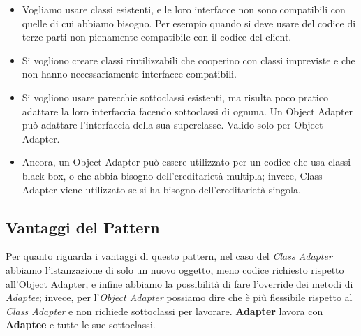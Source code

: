    \begin{itemize}
      
      \item Vogliamo usare classi esistenti, e le loro
      interfacce non sono compatibili con quelle di cui abbiamo bisogno.
      Per esempio quando si deve usare del codice di terze parti non 
      pienamente compatibile con il codice del client.
    
      \item Si vogliono creare classi riutilizzabili che cooperino con 
      classi impreviste e che non hanno necessariamente interfacce 
      compatibili.
      
      \item Si vogliono usare parecchie sottoclassi esistenti, ma risulta 
      poco pratico adattare la loro interfaccia facendo sottoclassi di ognuna. 
      Un Object Adapter può adattare l’interfaccia della sua superclasse. 
      Valido solo per Object Adapter.
      
      \item Ancora, un Object Adapter può essere utilizzato per un codice 
      che usa classi black-box, o che abbia bisogno dell’ereditarietà 
      multipla; invece, Class Adapter viene utilizzato se si ha bisogno 
      dell’ereditarietà singola.
    
    \end{itemize}
    
    \subsection{Vantaggi del Pattern}
    
    Per quanto riguarda i vantaggi di questo pattern, nel caso del 
    \emph{Class Adapter} abbiamo l'istanzazione di solo un nuovo oggetto,
    meno codice richiesto rispetto all'Object Adapter, e infine abbiamo la 
    possibilità di fare l'override dei metodi di \emph{Adaptee}; invece,
    per l'\emph{Object Adapter} possiamo dire che è più flessibile rispetto
    al \emph{Class Adapter} e non richiede sottoclassi per lavorare.
    \textbf{Adapter} lavora con \textbf{Adaptee} e tutte le sue sottoclassi.
    